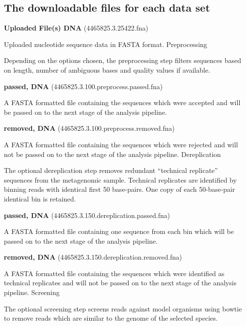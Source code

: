 \documentclass[12pt,fullpage]{report}
\begin{document}
\begin{appendices}
\chapter{The downloadable files for each data set}
\label{chapter:downloads}

\begin{mdframed}
\textbf{Uploaded File(s) DNA} (4465825.3.25422.fna)

Uploaded nucleotide sequence data in FASTA format.
Preprocessing

Depending on the options chosen, the preprocessing step filters sequences based on length, number of ambiguous bases and quality values if available.

\textbf{passed, DNA} (4465825.3.100.preprocess.passed.fna)

A FASTA formatted file containing the sequences which were accepted and will be passed on to the next stage of the analysis pipeline.

\textbf{removed, DNA} (4465825.3.100.preprocess.removed.fna)

A FASTA formatted file containing the sequences which were rejected and will not be passed on to the next stage of the analysis pipeline.
Dereplication

The optional dereplication step removes redundant ``technical replicate'' sequences from the metagenomic sample. Technical replicates are identified by binning reads with identical first 50 base-pairs. One copy of each 50-base-pair identical bin is retained.

\textbf{passed, DNA} (4465825.3.150.dereplication.passed.fna)

A FASTA formatted file containing one sequence from each bin which will be passed on to the next stage of the analysis pipeline.

\textbf{removed, DNA} (4465825.3.150.dereplication.removed.fna)

A FASTA formatted file containing the sequences which were identified as technical replicates and will not be passed on to the next stage of the analysis pipeline.
Screening

The optional screening step screens reads against model organisms using bowtie to remove reads which are similar to the genome of the selected species.


\end{mdframed}
\end{appendices}
\end{document}
